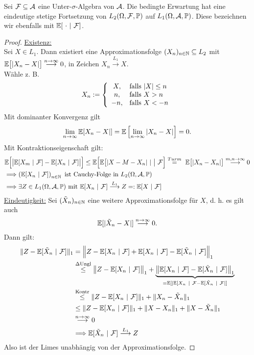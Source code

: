 \setcounter{satz}{5} %
\begin{proposition}\label{Prop1.6} %
Sei $\mathcal{F}\subseteq\mathcal{A}$ eine Unter-$\sigma$-Algebra von $\mathcal{A}$. Die bedingte Erwartung hat eine eindeutige stetige Fortsetzung von $L_2(\Omega,\mathcal{F},\mathbb{P})$ auf $L_1(\Omega,\mathcal{A},\mathbb{P})$. Diese bezeichnen wir ebenfalls mit $\mathbb{E}[~\cdot~|~\mathcal{F}]$.
\end{proposition}
\begin{proof}
\underline{Existenz:}\\
Sei $X\in L_1$. Dann existiert eine Approximationsfolge $(X_n)_{n\in\mathbb{N}}\subseteq L_2$ mit\\ $\mathbb{E}\big[|X_n-X|\big]\stackrel{n\to\infty}{\longrightarrow}0$, in Zeichen $X_n\stackrel{L_1}{\longrightarrow} X$.\\
Wähle z. B.
\begin{align*}
X_n:=\left\lbrace\begin{array}{cl}
X, & \text{falls } |X|\leq n\\
n, & \text{falls } X>n\\
-n, & \text{falls } X<-n
\end{array}\right.
\end{align*}
Mit dominanter Konvergenz gilt 
\begin{align*}
\lim\limits_{n\to\infty}\mathbb{E}[X_n-X|]=\mathbb{E}\left[\lim\limits_{n\to\infty}|X_n-X|\right]=0.
\end{align*}
Mit Kontraktionseigenschaft gilt:
\begin{align*}
&\mathbb{E}\Big[\big|\mathbb{E}[X_m~|~\mathcal{F}]-\mathbb{E}[X_n~|~\mathcal{F}]\big|\Big]
\leq\mathbb{E}\Big[\mathbb{E}\big[|X-M-X_n|~|~\big|~\mathcal{F}\Big]
\stackrel{Turm}{=}~
\mathbb{E}\big[|X_n-X_n|\big]
\stackrel{m,n\to\infty}{\longrightarrow}
0\\
&\Longrightarrow\left(\mathbb{E}[X_n~|~\mathcal{F}]\right)_{n\in\mathbb{N}}\text{ ist Cauchy-Folge in }L_2(\Omega,\mathcal{A},\mathbb{P})\\
&\Longrightarrow\exists Z\in L_1(\Omega,\mathcal{A},\mathbb{P})\text{ mit }\mathbb{E}[X_n~|~\mathcal{F}]\stackrel{L_1}{\longrightarrow} Z=:\mathbb{E}[X~|~\mathcal{F}]
\end{align*}
\underline{Eindeutigkeit:} Sei $(\tilde{X}_n)_{n\in\mathbb{N}}$ eine weitere Approximationsfolge für $X$, d. h. es gilt auch
\begin{align*}
\mathbb{E}[|\tilde{X}_n-X|]
\stackrel{n\to\infty}{\longrightarrow}
0.
\end{align*}
Dann gilt:
\begin{align*}
\Vert Z-\mathbb{E}[\tilde{X}_n~|~\mathcal{F}]\Vert_1
&=\Big
\Vert Z-\mathbb{E}[X_n~|~\mathcal{F}]+\mathbb{E}[X_n~|~\mathcal{F}]-\mathbb{E}[\tilde{X}_n~|~\mathcal{F}]\Big\Vert_1\\
&\stackrel{\Delta\text{Ungl}}{\leq}
\big\Vert Z-\mathbb{E}[X_n~|~\mathcal{F}]\big\Vert_1+\underbrace{\big\Vert\mathbb{E}[X_n~|~\mathcal{F}]-\mathbb{E}[\tilde{X}_n~|~\mathcal{F}]\big\Vert_1}_{=\mathbb{E}[|\mathbb{E}[X_n~|~\mathcal{F}-\mathbb{E}[\tilde{X}_n~|~\mathcal{F}|]}\\
&\stackrel{\text{Kontr}}{\leq}
\Vert Z-\mathbb{E}[X_n~|~\mathcal{F}]\Vert_1+\Vert X_n-\tilde{X}_n\Vert_1\\
&\leq\Vert Z-\mathbb{E}[X_n~|~\mathcal{F}]\Vert_1+\Vert X-X_n\Vert_1+\Vert X-\tilde{X}_n\Vert_1\\
&\stackrel{n\to\infty}{\longrightarrow}
0\\
&\Longrightarrow\mathbb{E}[\tilde{X}_n~|~\mathcal{F}]\stackrel{L_1}{\longrightarrow} Z
\end{align*}
Also ist der Limes unabhängig von der Approximationsfolge.
\end{proof}

